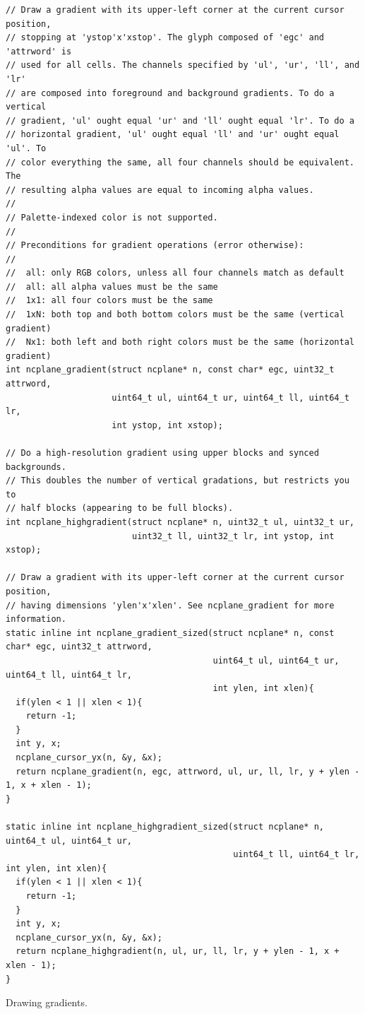 \documentclass[letterpaper,10pt]{article}
\begin{document}
\begin{listing}[!htbp]
\begin{verbatim}
// Draw a gradient with its upper-left corner at the current cursor position,
// stopping at 'ystop'x'xstop'. The glyph composed of 'egc' and 'attrword' is
// used for all cells. The channels specified by 'ul', 'ur', 'll', and 'lr'
// are composed into foreground and background gradients. To do a vertical
// gradient, 'ul' ought equal 'ur' and 'll' ought equal 'lr'. To do a
// horizontal gradient, 'ul' ought equal 'll' and 'ur' ought equal 'ul'. To
// color everything the same, all four channels should be equivalent. The
// resulting alpha values are equal to incoming alpha values.
//
// Palette-indexed color is not supported.
//
// Preconditions for gradient operations (error otherwise):
//
//  all: only RGB colors, unless all four channels match as default
//  all: all alpha values must be the same
//  1x1: all four colors must be the same
//  1xN: both top and both bottom colors must be the same (vertical gradient)
//  Nx1: both left and both right colors must be the same (horizontal gradient)
int ncplane_gradient(struct ncplane* n, const char* egc, uint32_t attrword,
                     uint64_t ul, uint64_t ur, uint64_t ll, uint64_t lr,
                     int ystop, int xstop);

// Do a high-resolution gradient using upper blocks and synced backgrounds.
// This doubles the number of vertical gradations, but restricts you to
// half blocks (appearing to be full blocks).
int ncplane_highgradient(struct ncplane* n, uint32_t ul, uint32_t ur,
                         uint32_t ll, uint32_t lr, int ystop, int xstop);

// Draw a gradient with its upper-left corner at the current cursor position,
// having dimensions 'ylen'x'xlen'. See ncplane_gradient for more information.
static inline int ncplane_gradient_sized(struct ncplane* n, const char* egc, uint32_t attrword,
                                         uint64_t ul, uint64_t ur, uint64_t ll, uint64_t lr,
                                         int ylen, int xlen){
  if(ylen < 1 || xlen < 1){
    return -1;
  }
  int y, x;
  ncplane_cursor_yx(n, &y, &x);
  return ncplane_gradient(n, egc, attrword, ul, ur, ll, lr, y + ylen - 1, x + xlen - 1);
}

static inline int ncplane_highgradient_sized(struct ncplane* n, uint64_t ul, uint64_t ur,
                                             uint64_t ll, uint64_t lr, int ylen, int xlen){
  if(ylen < 1 || xlen < 1){
    return -1;
  }
  int y, x;
  ncplane_cursor_yx(n, &y, &x);
  return ncplane_highgradient(n, ul, ur, ll, lr, y + ylen - 1, x + xlen - 1);
}
\end{verbatim}
\caption{Drawing gradients.}
\label{list:gradients}
\end{listing}
\end{document}
